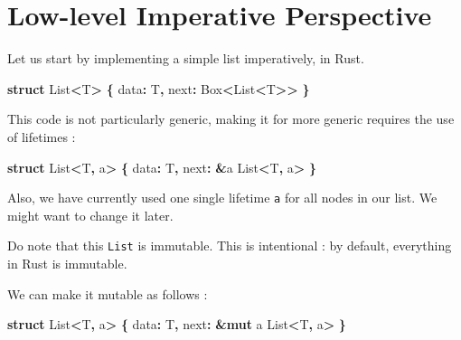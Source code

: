 \documentclass[
]{book}
\newenvironment{Shaded}{\begin{snugshade}}{\end{snugshade}}
\newcommand{\DataTypeTok}[1]{\textcolor[rgb]{0.13,0.29,0.53}{#1}}
\newcommand{\KeywordTok}[1]{\textcolor[rgb]{0.13,0.29,0.53}{\textbf{#1}}}
\newcommand{\NormalTok}[1]{#1}
\newcommand{\OperatorTok}[1]{\textcolor[rgb]{0.81,0.36,0.00}{\textbf{#1}}}
\newcommand{\OtherTok}[1]{\textcolor[rgb]{0.56,0.35,0.01}{#1}}
\begin{document}
\hypertarget{low-level-imperative-perspective}{%
\section{Low-level Imperative Perspective}\label{low-level-imperative-perspective}}

Let us start by implementing a simple list imperatively, in Rust.

\begin{Shaded}
\begin{Highlighting}[]
\KeywordTok{struct}\NormalTok{ List}\OperatorTok{\textless{}}\NormalTok{T}\OperatorTok{\textgreater{}} \OperatorTok{\{}
\NormalTok{    data}\OperatorTok{:}\NormalTok{ T}\OperatorTok{,}
\NormalTok{    next}\OperatorTok{:} \DataTypeTok{Box}\OperatorTok{\textless{}}\NormalTok{List}\OperatorTok{\textless{}}\NormalTok{T}\OperatorTok{\textgreater{}\textgreater{}}
\OperatorTok{\}}
\end{Highlighting}
\end{Shaded}

This code is not particularly generic, making it for more generic requires the use of lifetimes :

\begin{Shaded}
\begin{Highlighting}[]
\KeywordTok{struct}\NormalTok{ List}\OperatorTok{\textless{}}\NormalTok{T}\OperatorTok{,} \OtherTok{\textquotesingle{}a}\OperatorTok{\textgreater{}} \OperatorTok{\{}
\NormalTok{    data}\OperatorTok{:}\NormalTok{ T}\OperatorTok{,}
\NormalTok{    next}\OperatorTok{:} \OperatorTok{\&}\OtherTok{\textquotesingle{}a}\NormalTok{ List}\OperatorTok{\textless{}}\NormalTok{T}\OperatorTok{,} \OtherTok{\textquotesingle{}a}\OperatorTok{\textgreater{}}
\OperatorTok{\}}
\end{Highlighting}
\end{Shaded}

Also, we have currently used one single lifetime \texttt{\textquotesingle{}a} for all nodes in our list.
We might want to change it later.

Do note that this \texttt{List} is immutable. This is intentional : by default, everything in Rust is immutable.

We can make it mutable as follows :

\begin{Shaded}
\begin{Highlighting}[]
\KeywordTok{struct}\NormalTok{ List}\OperatorTok{\textless{}}\NormalTok{T}\OperatorTok{,} \OtherTok{\textquotesingle{}a}\OperatorTok{\textgreater{}} \OperatorTok{\{}
\NormalTok{    data}\OperatorTok{:}\NormalTok{ T}\OperatorTok{,}
\NormalTok{    next}\OperatorTok{:} \OperatorTok{\&}\KeywordTok{mut} \OtherTok{\textquotesingle{}a}\NormalTok{ List}\OperatorTok{\textless{}}\NormalTok{T}\OperatorTok{,} \OtherTok{\textquotesingle{}a}\OperatorTok{\textgreater{}}
\OperatorTok{\}}
\end{Highlighting}
\end{Shaded}
\end{document}
